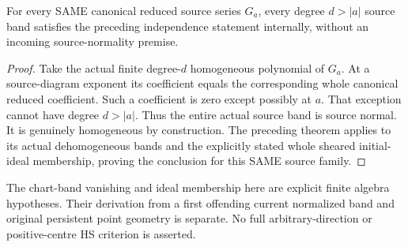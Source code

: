 \begin{theorem}
\label{hir:actual-canonical-higher-band-dehom-initial-independence}
\leanok
For every SAME canonical reduced source series $G_a$, every degree
$d>|a|$ source band satisfies the preceding independence statement
internally, without an incoming source-normality premise.
\end{theorem}
\begin{proof}
Take the actual finite degree-$d$ homogeneous polynomial of $G_a$.
At a source-diagram exponent its coefficient equals the corresponding
whole canonical reduced coefficient. Such a coefficient is zero except
possibly at $a$. That exception cannot have degree $d>|a|$.
Thus the entire actual source band is source normal. It is genuinely
homogeneous by construction. The preceding theorem applies to its
actual dehomogeneous bands and the explicitly stated whole sheared
initial-ideal membership, proving the conclusion for this SAME source
family.
\end{proof}

The chart-band vanishing and ideal membership here are explicit finite
algebra hypotheses. Their derivation from a first offending current
normalized band and original persistent point geometry is separate.
No full arbitrary-direction or positive-centre HS criterion is asserted.
